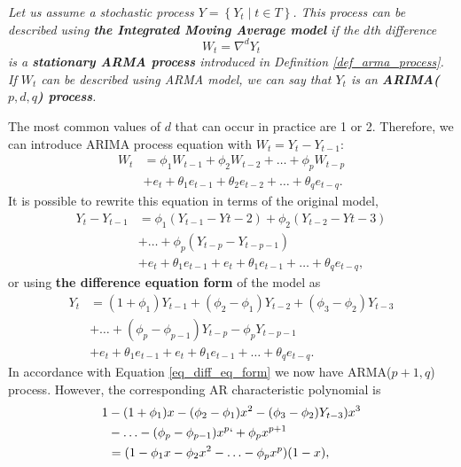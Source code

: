 \begin{definition}
\textit{
Let us assume a stochastic process $Y = \left\{Y_{t}\;|\;t \in T\right\}$. This process can be described using \textbf{the Integrated Moving Average model} if the $d$th difference 
\begin{equation}
    W_t = \nabla^d Y_t
\end{equation}
is a \textbf{stationary ARMA process} introduced in Definition \ref{def_arma_process}. If $W_t$ can be described using ARMA model, we can say that $Y_t$ is an \textbf{ARIMA($p, d, q$) process}.
}
\end{definition} 
The most common values of $d$ that can occur in practice are 1 or 2. Therefore, we can introduce ARIMA process equation with $W_t = Y_t - Y_{t-1}$: \begin{equation}\begin{aligned}
W_t &= \phi_{1}W_{t-1} + \phi_{2}W_{t-2} + \ldots + \phi_{p}W_{t-p} \\ 
    &+ e_t + \theta_{1}e_{t-1} + \theta_{2}e_{t-2} + \ldots + \theta_{q}e_{t-q}.
\end{aligned}
\label{eq_arima_process}
\end{equation}
It is possible to rewrite this equation in terms of the original model, \begin{equation}
\begin{aligned}
Y_t - Y_{t-1} &= \phi_{1}(Y_{t-1} - Y{t-2}) + \phi_{2}(Y_{t-2} - Y{t-3}) \\
&+ \ldots + \phi_{p}(Y_{t-p} - Y_{t-p-1})\\
&+ e_t + \theta_{1}e_{t-1} +  e_t + \theta_{1}e_{t-1} + \ldots + \theta_{q}e_{t-q},
\end{aligned}
\end{equation}
or using \textbf{the difference equation form} of the model \cite{cryer2008time} as \begin{equation}
\begin{aligned}
Y_t &= (1 + \phi_{1})Y_{t-1} + (\phi_{2} - \phi_{1})Y_{t-2} + (\phi_{3} - \phi_{2})Y_{t-3}\\
&+ \ldots + (\phi_{p} - \phi_{p-1})Y_{t-p} - \phi_{p}Y_{t-p-1} \\
&+ e_t + \theta_{1}e_{t-1} +  e_t + \theta_{1}e_{t-1} + \ldots + \theta_{q}e_{t-q}.
\end{aligned}
\label{eq_diff_eq_form}
\end{equation}
In accordance with Equation \ref{eq_diff_eq_form} we now have ARMA($p+1, q$) process. However, the corresponding AR characteristic polynomial is \begin{equation}
\begin{aligned}
    1 &- (1 + \phi_{1})x - (\phi_{2} - \phi_{1})x^2 - (\phi_{3} - \phi_{2})Y_{t-3})x^3 \\
    &- \ldots - (\phi_{p} - \phi_{p-1})x^p `+ \phi_{p}x^{p+1}\\
    &= (1 - \phi_{1}x - \phi_{2}x^2 - \ldots - \phi_{p}x^p)(1 - x),
\end{aligned}
\end{equation}
